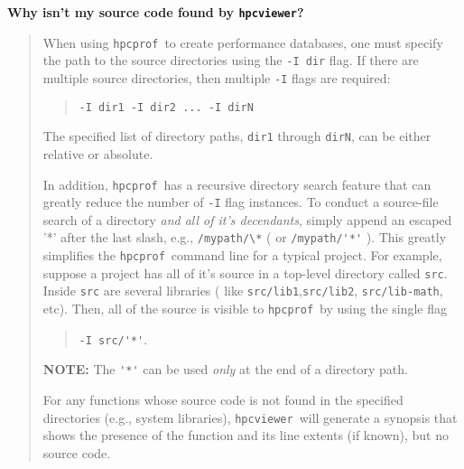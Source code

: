 \documentclass{article}
\newcommand{\hpcprof}{\texttt{hpcprof}}
\newcommand{\hpcviewer}{\texttt{hpcviewer}}
\begin{document}
\textbf{Why isn't my source code found by \hpcviewer ?}
\begin{comment}
(circular links in recursive search may lead to  inf loop)
\end{comment}
\begin{quote}
When using \hpcprof\ to create performance databases, one must specify the path 
to the source directories using the \verb|-I dir| flag. If there are multiple
source directories, then multiple \verb|-I| flags are required:
\begin{quote}
 \verb|-I dir1 -I dir2 ... -I dirN|
\end{quote}
The specified list of directory paths, \verb|dir1| through
\verb|dirN|, can be either relative or absolute.

In addition, \hpcprof\ has a recursive directory search feature that
can greatly reduce the number of \verb|-I| flag instances. To conduct
a source-file search of a directory \emph{and all of it's decendants},
simply append an escaped '*' after the last slash, e.g.,
\verb|/mypath/\*| ( or \verb|/mypath/'*'| ). This greatly simplifies
the \hpcprof\ command line for a typical project. For example, suppose
a project has all of it's source in a top-level directory called
\verb|src|. Inside \verb|src| are several libraries ( like
\verb|src/lib1|,\verb|src/lib2|, \verb|src/lib-math|, etc). Then, all
of the source is visible to \hpcprof\ by using the single flag
\begin{quote}
\verb|-I src/'*'|.
\end{quote}

\textbf{NOTE:} The \verb|'*'| can be used \emph{only} at the end of
a directory path.

For any functions whose source code is not found in the specified directories
(e.g., system libraries), \hpcviewer\ will generate a synopsis that shows
the presence of the function and its line extents (if known), but no
source code.
\end{quote}
\end{document}
